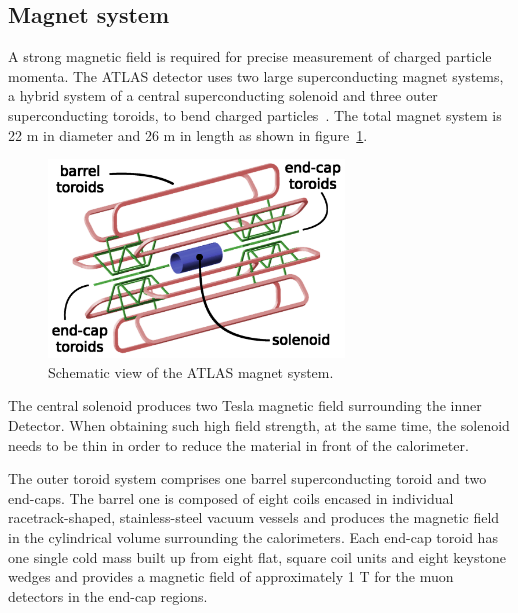 \subsection{Magnet system}

A strong magnetic field is required for precise measurement of charged particle momenta.
The ATLAS detector uses two large superconducting magnet systems, a hybrid system of a central superconducting solenoid and three outer superconducting toroids, to bend charged particles~\cite{McFayden:phdthesis}.
The total magnet system is 22 m in diameter and 26 m in length as shown in figure~\ref{fig:megnet_sys}.
\begin{figure}[!htb]
  \centering
  \includegraphics[width=0.7\textwidth]{figures/Detector/magnetSystems.png}
  \caption{Schematic view of the ATLAS magnet system.}
  \label{fig:megnet_sys}
\end{figure}

The central solenoid produces two Tesla magnetic field surrounding the inner Detector.
When obtaining such high field strength, at the same time, the solenoid needs to be thin in order to reduce the material in front of the calorimeter.

The outer toroid system comprises one barrel superconducting toroid and two end-caps.
The barrel one is composed of eight coils encased in individual racetrack-shaped, stainless-steel vacuum vessels and produces the magnetic field in the cylindrical volume surrounding the calorimeters.
Each end-cap toroid has one single cold mass built up from eight flat, square coil units and eight keystone wedges and provides a magnetic field of approximately 1 T for the muon detectors in the end-cap regions.
